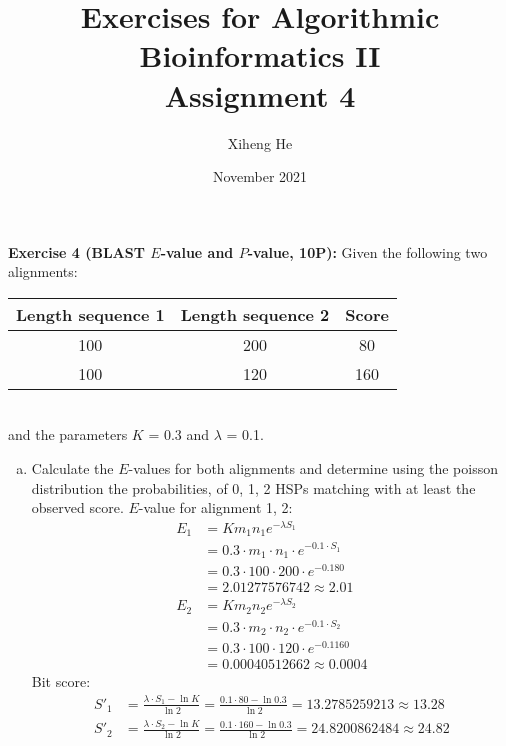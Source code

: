 \documentclass{article}
\title{Exercises for Algorithmic Bioinformatics II\\
Assignment 4}
\author{Xiheng He}
\date{November 2021}
\begin{document}
{\let\newpage\relax\maketitle}
\begin{flushleft}
\textbf{Exercise 4 (BLAST $E$-value and $P$-value, 10P):}
\newline
Given the following two alignments:
\newline \\
\begin{tabular}{|c|c|c|}
    \hline
    Length sequence 1 & Length sequence 2 & Score \\
    \hline
    100 & 200 & 80 \\
    \hline
    100 & 120 & 160 \\
    \hline
\end{tabular}
\newline\\
and the parameters $K$ = 0.3 and $\lambda$ = 0.1.
\newline
\begin{enumerate}[(a)]
    \item Calculate the $E$-values for both alignments and determine using the poisson distribution the
    probabilities, of 0, 1, 2 HSPs matching with at least the observed score.
    \newline
    $E$-value for alignment 1, 2:
    \begin{align*}
        E_1 &= K m_1 n_1 e^{-\lambda S_1} \\
          &= 0.3 \cdot m_1 \cdot n_1 \cdot e^{-0.1 \cdot S_1} \\
          &= 0.3 \cdot 100 \cdot 200 \cdot e^{-0.1 80} \\
          &= 2.01277576742 \approx 2.01 \\
        E_2 &= K m_2 n_2 e^{-\lambda S_2} \\
          &= 0.3 \cdot m_2 \cdot n_2 \cdot e^{-0.1 \cdot S_2} \\
          &= 0.3 \cdot 100 \cdot 120 \cdot e^{-0.1 160} \\
          &= 0.00040512662 \approx 0.0004
    \end{align*}
    Bit score:
    \begin{align*}
        S'_1 &= \frac{\lambda \cdot S_1 - \ln K}{\ln 2} = \frac{0.1 \cdot 80 - \ln 0.3}{\ln 2} = 13.2785259213 \approx 13.28 \\
        S'_2 &= \frac{\lambda \cdot S_2 - \ln K}{\ln 2} = \frac{0.1 \cdot 160 - \ln 0.3}{\ln 2} = 24.8200862484 \approx 24.82

\end{align*}
\end{enumerate}
\end{flushleft}
\end{document}

